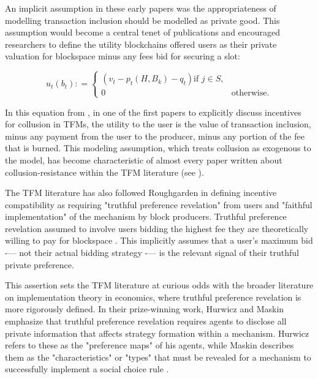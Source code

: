 \documentclass[oneside]{article}   	%
\begin{document}
An implicit assumption in these early papers was the appropriateness of modelling transaction inclusion should be modelled as private good. This assumption would become a central tenet of publications and encouraged researchers to define the utility blockchains offered users as their private valuation for blockspace minus any fees bid for securing a slot:

\[
u_t\left(b_t\right) : =
\begin{cases}
\left(
        v_t - p_t\left(H,B_k\right) - q_t
\right) \text{if } j \in S, \\ 0 & \text{otherwise.}
\end{cases}
\]

In this equation from \cite{roughgarden2024}, in one of the first papers to explicitly discuss incentives for collusion in TFMs, the utility to the user is the value of transaction inclusion, minus any payment from the user to the producer, minus any portion of the fee that is burned. This modeling assumption, which treats collusion as exogenous to the model, has become characteristic of almost every paper written about collusion-resistance within the TFM literature (see \cite{chen2022bayesian, ferreira2021dynamic, wu2023maximizing, damle2024designing, gafni2024barriers, bahrani2023transaction, bahrani2024transaction, chung2024collusion, chung2023foundations}).

The TFM literature has also followed Roughgarden in defining incentive compatibility as requiring "truthful preference revelation" from users and "faithful implementation" of the mechanism by block producers. Truthful preference revelation assumed to involve users bidding the highest fee they are theoretically willing to pay for blockspace \cite{roughgarden2024, chung2023foundations}. This implicitly assumes that a user’s maximum bid -— not their actual bidding strategy -— is the relevant signal of their truthful private preference.

This assertion sets the TFM literature at curious odds with the broader literature on implementation theory in economics, where truthful preference revelation is more rigorously defined. In their prize-winning work, Hurwicz and Maskin emphasize that truthful preference revelation requires agents to disclose all private information that affects strategy formation within a mechanism. Hurwicz refers to these as the "preference maps" of his agents, while Maskin describes them as the "characteristics" or "types" that must be revealed for a mechanism to successfully implement a social choice rule \cite{hurwicz1973design, hurwicz1960optimality, hurwicz2007guardians, hurwicz1979allocations, maskin1999nash, maskin2002}.
\end{document}
